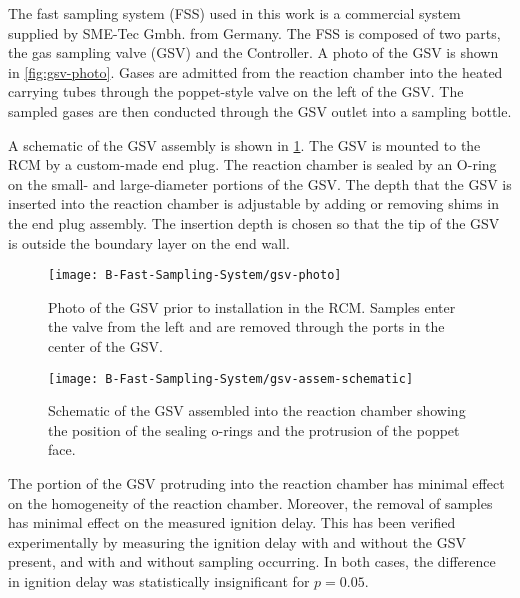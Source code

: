 \documentclass[../main.tex]{subfiles}
\begin{document}
The fast sampling system (FSS) used in this work is a commercial system supplied by
SME-Tec Gmbh. from Germany. The FSS is composed of two parts, the gas sampling valve
(GSV) and the Controller. A photo of the GSV is shown in \cref{fig:gsv-photo}.
Gases are admitted from the reaction chamber into the heated carrying tubes
through the poppet-style valve on the left of the GSV. The sampled gases are then
conducted through the GSV outlet into a sampling bottle.

A schematic of the GSV assembly is shown in \cref{fig:gsv-assem-schematic}.
The GSV is mounted to the RCM by a custom-made end plug. The reaction chamber
is sealed by an O-ring on the small- and large-diameter portions of the GSV.
The depth that the GSV is inserted into the reaction chamber is adjustable
by adding or removing shims in the end plug assembly. The insertion depth
is chosen so that the tip of the GSV is outside the boundary layer on the
end wall.

\begin{figure}
    \begin{floatrow}
        \ffigbox
            {\texttt{[image: B-Fast-Sampling-System/gsv-photo]}}
            {\caption[Photo of the GSV prior to installation in the RCM. Samples
            enter the valve from the left and are removed through the ports in the
            center of the\newline GSV.]{Photo of the GSV prior to installation in the RCM. Samples
            enter the valve from the left and are removed through the ports in the
            center of the GSV.}
            \label{fig:gsv-photo}}
        \ffigbox
            {\texttt{[image: B-Fast-Sampling-System/gsv-assem-schematic]}}
            {\caption{Schematic of the GSV assembled into the reaction chamber showing
            the position of the sealing o-rings and the protrusion of the poppet face.}
            \label{fig:gsv-assem-schematic}}
    \end{floatrow}
\end{figure}

The portion of the GSV protruding into the reaction chamber has minimal
effect on the homogeneity of the reaction chamber. Moreover, the removal of
samples has minimal effect on the measured ignition delay.
This has been verified experimentally by measuring the ignition delay with
and without the GSV present, and with and without sampling occurring.
In both cases, the difference in ignition delay was statistically insignificant
for $p=0.05$.
\end{document}
